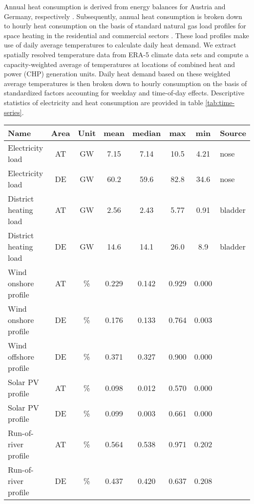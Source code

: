 \documentclass[final, 3p, times]{elsarticle} %
\begin{document}
    Annual heat consumption is derived from energy balances for Austria and Germany, respectively \citep{AGEB, OeSTAT2019}.
    Subsequently, annual heat consumption is broken down to hourly heat consumption on the basis of standard natural gas
    load profiles for space heating in the residential and commercial sectors \citep{Almbauer2008}.
    These load profiles make use of daily average temperatures to calculate daily heat demand.
    We extract spatially resolved temperature data from ERA-5 climate data sets \citep{era-5} and compute a capacity-weighted
    average of temperatures at locations of combined heat and power (CHP) generation units.
    Daily heat demand based on these weighted average temperatures is then broken down to hourly consumption on the
    basis of standardized factors accounting for weekday and time-of-day effects.
    Descriptive statistics of electricity and heat consumption are provided in table \ref{tab:time-series}.

    \begin{table*}[ht]
        \centering
        \caption{Descriptive data of time series used}\label{tab:time-series}
        \begin{tabular}{l c c c c c c l}
            \toprule
            Name & Area & Unit & mean & median & max & min & Source    \\
            \midrule
            Electricity load & AT & GW & 7.15 & 7.14 & 10.5 & 4.21 & nose      \\
            Electricity load & DE & GW & 60.2 & 59.6 & 82.8 & 34.6 & nose      \\
            District heating load & AT & GW & 2.56 & 2.43 & 5.77 & 0.91 & bladder   \\
            District heating load & DE & GW & 14.6 & 14.1 & 26.0 & 8.9 & bladder   \\
            Wind onshore profile & AT & \%    & 0.229 & 0.142 & 0.929 & 0.000 &           \\
            Wind onshore profile & DE & \%    & 0.176 & 0.133 & 0.764 & 0.003 &           \\
            Wind offshore profile & DE & \%    & 0.371 & 0.327 & 0.900 & 0.000 &           \\
            Solar PV profile & AT & \%    & 0.098 & 0.012 & 0.570 & 0.000 &           \\
            Solar PV profile & DE & \%    & 0.099 & 0.003 & 0.661 & 0.000 &           \\
            Run-of-river profile & AT & \%    & 0.564 & 0.538 & 0.971 & 0.202 &           \\
            Run-of-river profile & DE & \%    & 0.437 & 0.420 & 0.637 & 0.208 &           \\
            \bottomrule
        \end{tabular}
    \end{table*}
\end{document}

